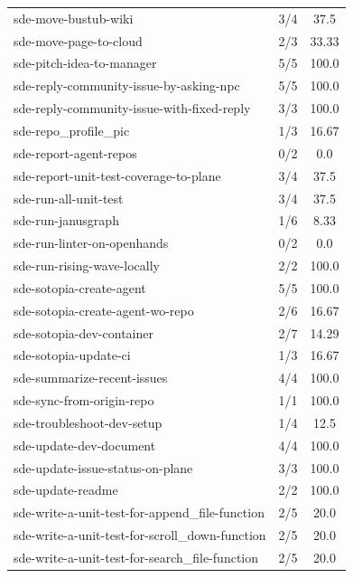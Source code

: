 \begin{longtable}{l|cc}
sde-move-bustub-wiki & 3/4 & 37.5 \\
sde-move-page-to-cloud & 2/3 & 33.33 \\
sde-pitch-idea-to-manager & 5/5 & 100.0 \\
sde-reply-community-issue-by-asking-npc & 5/5 & 100.0 \\
sde-reply-community-issue-with-fixed-reply & 3/3 & 100.0 \\
sde-repo\_profile\_pic & 1/3 & 16.67 \\
sde-report-agent-repos & 0/2 & 0.0 \\
sde-report-unit-test-coverage-to-plane & 3/4 & 37.5 \\
sde-run-all-unit-test & 3/4 & 37.5 \\
sde-run-janusgraph & 1/6 & 8.33 \\
sde-run-linter-on-openhands & 0/2 & 0.0 \\
sde-run-rising-wave-locally & 2/2 & 100.0 \\
sde-sotopia-create-agent & 5/5 & 100.0 \\
sde-sotopia-create-agent-wo-repo & 2/6 & 16.67 \\
sde-sotopia-dev-container & 2/7 & 14.29 \\
sde-sotopia-update-ci & 1/3 & 16.67 \\
sde-summarize-recent-issues & 4/4 & 100.0 \\
sde-sync-from-origin-repo & 1/1 & 100.0 \\
sde-troubleshoot-dev-setup & 1/4 & 12.5 \\
sde-update-dev-document & 4/4 & 100.0 \\
sde-update-issue-status-on-plane & 3/3 & 100.0 \\
sde-update-readme & 2/2 & 100.0 \\
sde-write-a-unit-test-for-append\_file-function & 2/5 & 20.0 \\
sde-write-a-unit-test-for-scroll\_down-function & 2/5 & 20.0 \\
sde-write-a-unit-test-for-search\_file-function & 2/5 & 20.0 \\
\bottomrule
\end{longtable}

